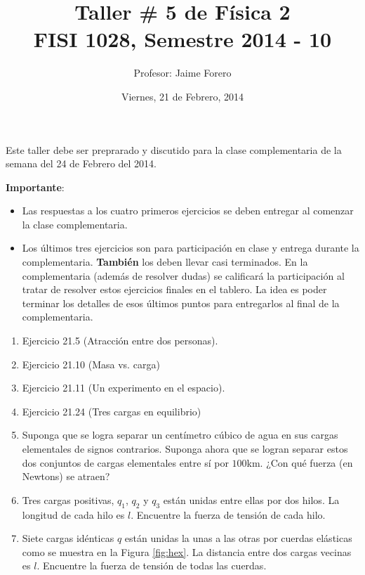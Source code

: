 \documentclass{article}
\title{Taller \# 5 de F\'isica 2\\ FISI 1028, Semestre 2014 - 10}
\author{Profesor: Jaime Forero}
\date{Viernes, 21 de Febrero, 2014}
\begin{document}
\maketitle
\thispagestyle{empty}

\noindent
Este taller debe ser preprarado y discutido para la clase
complementaria de la semana del 24 de Febrero del 2014. 

\noindent
{\bf Importante}:
\begin{itemize}

\item
Las respuestas a los cuatro primeros ejercicios se deben entregar al comenzar la
clase complementaria. 
\item 
Los \'ultimos tres ejercicios son para participaci\'on en clase y entrega
durante la complementaria. {\bf{Tambi\'en}} los deben llevar casi
terminados. En la complementaria (adem\'as de resolver dudas) se
calificar\'a la participaci\'on al tratar de resolver estos ejercicios
finales en el tablero. La idea es poder terminar los  detalles de esos
\'ultimos puntos para entregarlos al final de la complementaria.
\end{itemize}

\begin{enumerate}

\item
Ejercicio 21.5 (Atracci\'on entre dos personas).

\item
Ejercicio 21.10 (Masa vs. carga)

\item
Ejercicio 21.11 (Un experimento en el espacio).

\item
Ejercicio 21.24 (Tres cargas en equilibrio)


\item 
Suponga que se logra separar un cent\'imetro c\'ubico de agua en sus
cargas elementales de signos contrarios. Suponga ahora que se logran
separar estos dos conjuntos de cargas elementales entre s\'i por
$100$km. ¿Con qué fuerza (en Newtons) se atraen?

\item
Tres cargas positivas, $q_1$, $q_2$ y $q_3$ est\'an unidas entre ellas
por dos hilos. La longitud de cada hilo es $l$. Encuentre la fuerza de
tensi\'on de cada hilo.

\item
\label{exo:hex}
Siete cargas id\'enticas $q$ est\'an unidas la unas a las otras por
cuerdas el\'asticas como se muestra en la Figura \ref{fig:hex}. La
distancia entre dos cargas vecinas es $l$. Encuentre la fuerza de
tensión de todas las cuerdas. 
\end{enumerate}
\end{document}
